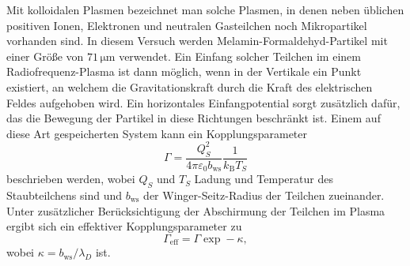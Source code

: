 \documentclass[numbers=noenddot,a4paper,notitlepage,twoside,BCOR15mm]{scrartcl}
\begin{document}
	Mit kolloidalen Plasmen bezeichnet man solche Plasmen, in denen neben üblichen positiven Ionen, Elektronen und neutralen Gasteilchen noch Mikropartikel vorhanden sind. In diesem Versuch werden Melamin-Formaldehyd-Partikel mit einer Größe von $71\,\mathrm{\mu m}$ verwendet. Ein Einfang solcher Teilchen im einem Radiofrequenz-Plasma ist dann möglich, wenn in der Vertikale ein Punkt existiert, an welchem die Gravitationskraft durch die Kraft des elektrischen Feldes aufgehoben wird. Ein horizontales Einfangpotential sorgt zusätzlich dafür, das die Bewegung der Partikel in diese Richtungen beschränkt ist.
	Einem auf diese Art gespeicherten System kann ein Kopplungsparameter
	\begin{equation}
		\Gamma = \frac{Q_S^2}{4\pi\varepsilon_0 b_\mathrm{ws}}\frac{1}{k_\mathrm{B}T_S}
	\end{equation}
	beschrieben werden, wobei $Q_S$ und $T_S$ Ladung und Temperatur des Staubteilchens sind und $b_\mathrm{ws}$ der Winger-Seitz-Radius der Teilchen zueinander. Unter zusätzlicher Berücksichtigung der Abschirmung der Teilchen im Plasma ergibt sich ein effektiver Kopplungsparameter zu
	\begin{equation}
		\Gamma_\mathrm{eff} = \Gamma \exp -\kappa,
	\end{equation}
	wobei $\kappa = b_\mathrm{ws}/\lambda_D$ ist.
	
\end{document}
